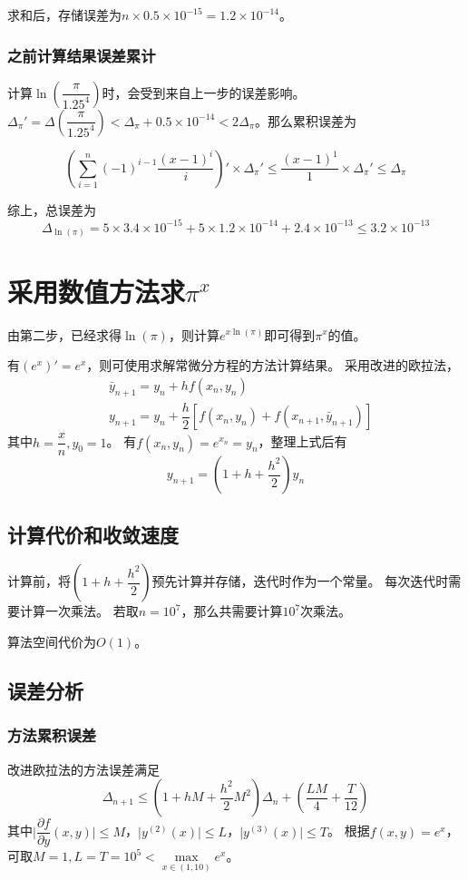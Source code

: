 \documentclass[11pt,a4paper]{ctexart}
\begin{document}
求和后，存储误差为$n\times 0.5 \times 10^{-15} = 1.2 \times 10^{-14}$。

\subsubsection{之前计算结果误差累计}
计算$\ln(\dfrac{\pi}{1.25^4})$时，会受到来自上一步的误差影响。
$\Delta_{\pi}' = \Delta(\dfrac{\pi}{1.25^4}) < \Delta_{\pi} + 0.5\times 10^{-14} < 2\Delta_\pi$。那么累积误差为

$$\left(\sum\limits_{i = 1}^{n} (-1)^{i-1} \dfrac{(x-1)^i}{i}\right)' \times \Delta_\pi' \le \dfrac{(x-1)^1}{1} \times \Delta_\pi' \le \Delta_\pi$$

综上，总误差为
$$\Delta_{\ln(\pi)} = 5 \times 3.4\times 10^{-15} + 5 \times 1.2\times 10^{-14} + 2.4 \times 10^{-13} \le 3.2\times 10^{-13}$$

\section{采用数值方法求$\pi^x$}
由第二步，已经求得$\ln(\pi)$，则计算$e^{x\ln(\pi)}$即可得到$\pi^x$的值。

有$(e^x)' = e^x$，则可使用求解常微分方程的方法计算结果。
采用改进的欧拉法，
\begin{align*}
    &\bar{y}_{n+1} = y_n + hf(x_n, y_n) \\
    &y_{n+1} = y_n + \dfrac{h}{2}\left[f(x_n, y_n) + f(x_{n+1}, \bar{y}_{n+1})\right]
\end{align*}
其中$h = \dfrac{x}{n}, y_0 = 1$。
有$f(x_n, y_n) = e^{x_n} = y_n$，整理上式后有
$$y_{n+1} = (1 + h + \dfrac{h^2}{2})y_n$$

\subsection{计算代价和收敛速度}
计算前，将$(1+h+\dfrac{h^2}{2})$预先计算并存储，迭代时作为一个常量。
每次迭代时需要计算一次乘法。
若取$n = 10^7$，那么共需要计算$10^7$次乘法。

算法空间代价为$O(1)$。


\subsection{误差分析}
\subsubsection{方法累积误差}
改进欧拉法的方法误差满足
$$\Delta_{n+1} \le (1 + hM + \dfrac{h^2}{2}M^2)\Delta_n + (\dfrac{LM}{4}+\dfrac{T}{12})$$
其中$\lvert\dfrac{\partial f}{\partial y}(x, y)\rvert \le M$，$\lvert y^{(2)}(x)\rvert \le L$，$\lvert y^{(3)}(x)\rvert \le T$。
根据$f(x, y) = e^x$，可取$M = 1, L = T = 10^5 < \max\limits_{x\in(1, 10)}e^x$。
\end{document}
